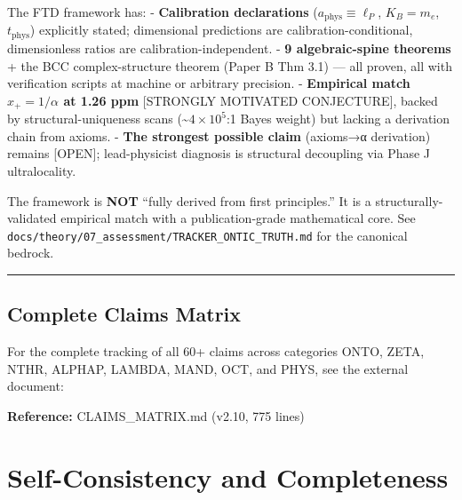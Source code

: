 \documentclass[
  11pt,
  letterpaper,
  twoside,
  openright]{book}
\begin{document}
\begin{tcolorbox}[enhanced jigsaw, coltitle=black, colbacktitle=quarto-callout-note-color!10!white, toprule=.15mm, colframe=quarto-callout-note-color-frame, arc=.35mm, opacityback=0, bottomtitle=1mm, toptitle=1mm, breakable, colback=white, titlerule=0mm, opacitybacktitle=0.6, title=\textcolor{quarto-callout-note-color}{\faInfo}\hspace{0.5em}{Framework Status (post-2026-05-03 honest accounting)}, rightrule=.15mm, bottomrule=.15mm, leftrule=.75mm, left=2mm]

The FTD framework has: - \textbf{Calibration declarations}
(\(a_\mathrm{phys} \equiv \ell_P\), \(K_B = m_e\), \(t_\mathrm{phys}\))
explicitly stated; dimensional predictions are calibration-conditional,
dimensionless ratios are calibration-independent. - \textbf{9
algebraic-spine theorems} + the BCC complex-structure theorem (Paper B
Thm 3.1) --- all proven, all with verification scripts at machine or
arbitrary precision. - \textbf{Empirical match \(x_+ = 1/\alpha\) at
1.26 ppm} {[}STRONGLY MOTIVATED CONJECTURE{]}, backed by
structural-uniqueness scans (\textasciitilde{}\(4{\times}10^5\):1 Bayes
weight) but lacking a derivation chain from axioms. - \textbf{The
strongest possible claim} (axioms→α derivation) remains {[}OPEN{]};
lead-physicist diagnosis is structural decoupling via Phase J
ultralocality.

The framework is \textbf{NOT} ``fully derived from first principles.''
It is a structurally-validated empirical match with a publication-grade
mathematical core. See
\texttt{docs/theory/07\_assessment/TRACKER\_ONTIC\_TRUTH.md} for the
canonical bedrock.

\end{tcolorbox}

\begin{center}\rule{0.5\linewidth}{0.5pt}\end{center}

\section{Complete Claims Matrix}\label{complete-claims-matrix}

For the complete tracking of all 60+ claims across categories ONTO,
ZETA, NTHR, ALPHAP, LAMBDA, MAND, OCT, and PHYS, see the external
document:

\textbf{Reference:} CLAIMS\_MATRIX.md (v2.10, 775 lines)

\chapter{Self-Consistency and Completeness}\label{sec-self-consistency}
\end{document}
